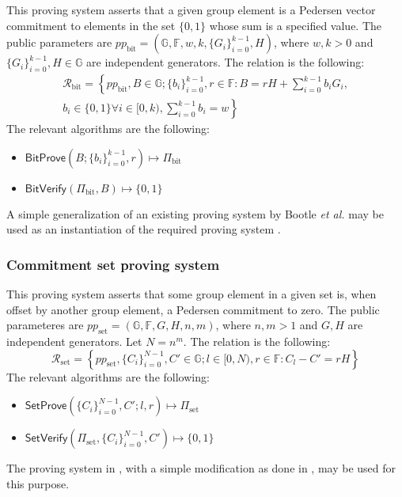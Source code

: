 \documentclass{llncs}
\newcommand{\G}{\mathbb{G}}
\newcommand{\F}{\mathbb{F}}
\newcommand{\func}[1]{\mathsf{#1}}
\begin{document}
This proving system asserts that a given group element is a Pedersen vector commitment to elements in the set $\{0,1\}$ whose sum is a specified value.
The public parameters are $pp_{\text{bit}} = \left( \G, \F, w, k, \{G_i\}_{i=0}^{k-1}, H \right)$, where $w, k > 0$ and $\{G_i\}_{i=0}^{k-1}, H \in \G$ are independent generators.
The relation is the following:
\begin{multline*}
\mathcal{R}_{\text{bit}} = \left\{ pp_{\text{bit}}, B \in \G ; \{b_i\}_{i=0}^{k-1}, r \in \F : B = rH + \sum_{i=0}^{k-1} b_i G_i, \right. \\
\left. b_i \in \{0,1\} \forall i \in [0,k), \sum_{i=0}^{k-1} b_i = w \right\}
\end{multline*}
The relevant algorithms are the following:
\begin{itemize}
	\item $\func{BitProve}\left( B ; \{b_i\}_{i=0}^{k-1}, r \right) \mapsto \Pi_{\text{bit}}$
	\item $\func{BitVerify}\left( \Pi_{\text{bit}}, B \right) \mapsto \{0, 1\}$
\end{itemize}
A simple generalization of an existing proving system by Bootle \textit{et al.} may be used as an instantiation of the required proving system \cite{bootle}.


\subsubsection{Commitment set proving system}

This proving system asserts that some group element in a given set is, when offset by another group element, a Pedersen commitment to zero.
The public parameteres are $pp_{\text{set}} = (\G, \F, G, H, n, m)$, where $n, m > 1$ and $G, H$ are independent generators.
Let $N = n^m$.
The relation is the following:
\[ \mathcal{R}_{\text{set}} = \left\{ pp_{\text{set}}, \{C_i\}_{i=0}^{N-1}, C' \in \G ; l \in [0,N), r \in \F : C_l - C' = rH \right\} \]
The relevant algorithms are the following:
\begin{itemize}
	\item $\func{SetProve}\left( \{C_i\}_{i=0}^{N-1}, C' ; l, r \right) \mapsto \Pi_{\text{set}}$
	\item $\func{SetVerify}\left( \Pi_{\text{set}}, \{C_i\}_{i=0}^{N-1}, C' \right) \mapsto \{0, 1\}$
\end{itemize}
The proving system in \cite{bootle}, with a simple modification as done in \cite{spark}, may be used for this purpose.
\end{document}
